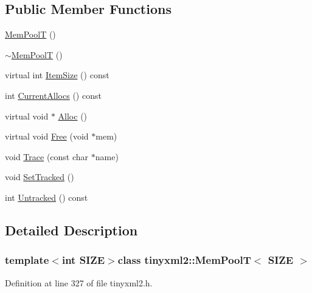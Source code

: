 \subsection*{Public Member Functions}
\begin{DoxyCompactItemize}
\item 
\hyperlink{classtinyxml2_1_1_mem_pool_t_a8a69a269ea72e292dde65309528ef64b}{Mem\+Pool\+T} ()
\item 
\hyperlink{classtinyxml2_1_1_mem_pool_t_ad6bb8346ad5b9a34f8f0051da5e3ed3f}{$\sim$\+Mem\+Pool\+T} ()
\item 
virtual int \hyperlink{classtinyxml2_1_1_mem_pool_t_a7ec8778fe99f6e332615a703be0b48bc}{Item\+Size} () const 
\item 
int \hyperlink{classtinyxml2_1_1_mem_pool_t_a56be11b7db6a7ef00db17088a7769aab}{Current\+Allocs} () const 
\item 
virtual void $\ast$ \hyperlink{classtinyxml2_1_1_mem_pool_t_aa9d785a48ffe6ea1be679bab13464486}{Alloc} ()
\item 
virtual void \hyperlink{classtinyxml2_1_1_mem_pool_t_a4f1a0c434e9e3d7391e5c16ed4ee8c70}{Free} (void $\ast$mem)
\item 
void \hyperlink{classtinyxml2_1_1_mem_pool_t_a0bc596f271e0f139822c534238b3f244}{Trace} (const char $\ast$name)
\item 
void \hyperlink{classtinyxml2_1_1_mem_pool_t_a7798932414916199a1bc0f9c3f368521}{Set\+Tracked} ()
\item 
int \hyperlink{classtinyxml2_1_1_mem_pool_t_a524b90d0edeac41964c06510757dce0f}{Untracked} () const 
\end{DoxyCompactItemize}


\subsection{Detailed Description}
\subsubsection*{template$<$int S\+I\+Z\+E$>$class tinyxml2\+::\+Mem\+Pool\+T$<$ S\+I\+Z\+E $>$}



Definition at line 327 of file tinyxml2.\+h.



